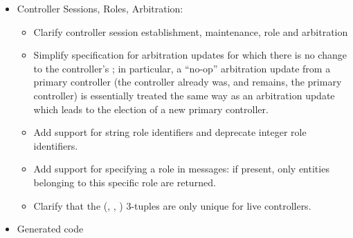 \documentclass[11pt]{article}
\begin{document}
{\begin{itemize}
\item{}
Controller Sessions, Roles, Arbitration:%

\begin{itemize}[noitemsep,topsep=\mdcompacttopsep]%

\item{}Clarify controller session establishment, maintenance, role and arbitration%

\item{}Simplify specification for arbitration updates for which there is no change
to the controller's ; in particular, a \textquotedblleft{}no-op\textquotedblright{} arbitration
update from a primary controller (the controller already was, and remains,
the primary controller) is essentially treated the same way as an
arbitration update which leads to the election of a new primary controller.%

\item{}Add support for string role identifiers and deprecate integer role
identifiers.%

\item{}Add support for specifying a role in  messages: if present,
only entities belonging to this specific role are returned.%

\item{}Clarify that the (, , ) 3-tuples are only
unique for live controllers.%
\end{itemize}%

\item{}
Generated code%

\begin{itemize}[noitemsep,topsep=\mdcompacttopsep]%


\end{itemize}
\end{itemize}}
\end{document}
